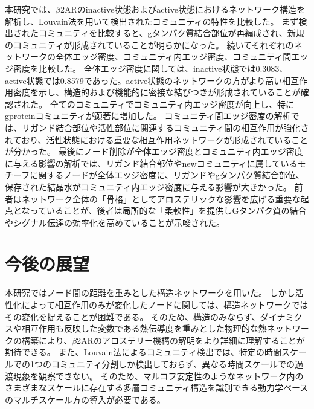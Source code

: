 本研究では、$\beta$2ARのinactive状態およびactive状態におけるネットワーク構造を解析し、Louvain法を用いて検出されたコミュニティの特性を比較した。
まず検出されたコミュニティを比較すると、gタンパク質結合部位が再編成され、新規のコミュニティが形成されていることが明らかになった。
続いてそれぞれのネットワークの全体エッジ密度、コミュニティ内エッジ密度、コミュニティ間エッジ密度を比較した。
全体エッジ密度に関しては、inactive状態では0.3083、active状態では0.8579であった。active状態のネットワークの方がより高い相互作用密度を示し、構造的および機能的に密接な結びつきが形成されていることが確認された。
全てのコミュニティでコミュニティ内エッジ密度が向上し、特にgproteinコミュニティが顕著に増加した。
コミュニティ間エッジ密度の解析では、リガンド結合部位や活性部位に関連するコミュニティ間の相互作用が強化されており、活性状態における重要な相互作用ネットワークが形成されていることが分かった。
最後にノード削除が全体エッジ密度とコミュニティ内エッジ密度に与える影響の解析では、リガンド結合部位やnewコミュニティに属しているモチーフに関するノードが全体エッジ密度に、リガンドやgタンパク質結合部位、保存された結晶水がコミュニティ内エッジ密度に与える影響が大きかった。
前者はネットワーク全体の「骨格」としてアロステリックな影響を広げる重要な起点となっていることが、後者は局所的な「柔軟性」を提供しGタンパク質の結合やシグナル伝達の効率化を高めていることが示唆された。

\section{今後の展望}
本研究ではノード間の距離を重みとした構造ネットワークを用いた。
しかし活性化によって相互作用のみが変化したノードに関しては、構造ネットワークではその変化を捉えることが困難である。
そのため、構造のみならず、ダイナミクスや相互作用も反映した変数である熱伝導度を重みとした物理的な熱ネットワークの構築により、$\beta$2ARのアロステリー機構の解明をより詳細に理解することが期待できる。
また、Louvain法によるコミュニティ検出では、特定の時間スケールでの1つのコミュニティ分割しか検出しておらず、異なる時間スケールでの過渡現象を観察できない。
そのため、マルコフ安定性のようなネットワーク内のさまざまなスケールに存在する多層コミュニティ構造を識別できる動力学ベースのマルチスケール方の導入が必要である。
